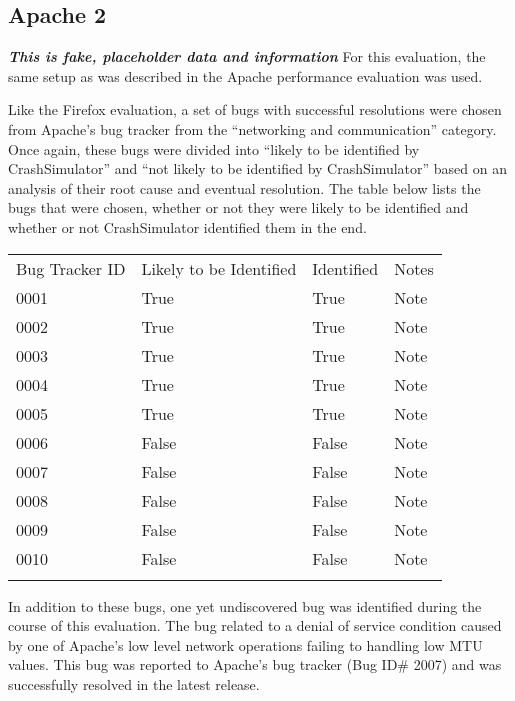         \subsection{Apache 2}

            \textbf{\emph{This is fake, placeholder data and information}}
            For this evaluation, the same setup as was described in the Apache performance evaluation was used.

            Like the Firefox evaluation, a set of bugs with successful resolutions were chosen from Apache's bug tracker
            from the ``networking and communication'' category. Once again, these bugs were divided into ``likely to be
            identified by CrashSimulator'' and ``not likely to be identified by CrashSimulator'' based on an analysis of
            their root cause and eventual resolution. The table below lists the bugs that were chosen, whether or not
            they were likely to be identified and whether or not CrashSimulator identified them in the end.

            \begin{table}[H]
                \scriptsize{}
                \begin{tabular}{l  l  l  l}
                    \toprule{}
                        Bug Tracker ID & Likely to be Identified & Identified & Notes \\
                        0001 & True & True & Note \\
                        0002 & True & True & Note \\
                        0003 & True & True & Note \\
                        0004 & True & True & Note \\
                        0005 & True & True & Note \\
                        0006 & False & False & Note \\
                        0007 & False & False & Note \\
                        0008 & False & False & Note \\
                        0009 & False & False & Note \\
                        0010 & False & False & Note \\
                    \bottomrule{}
                \end{tabular}
            \end{table}

            In addition to these bugs, one yet undiscovered bug was identified during the course of this evaluation.
            The bug related to a denial of service condition caused by one of Apache's low level network operations
            failing to handling low MTU values. This bug was reported to Apache's bug tracker (Bug ID\# 2007) and was
            successfully resolved in the latest release.

